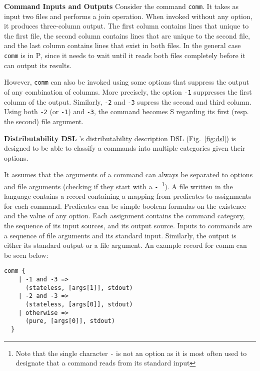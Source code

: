 \documentclass[sigplan,10pt,review,anonymous]{acmart}
\newcommand{\heading}[1]{\vspace{4pt}\noindent\textbf{#1}\enspace}
\newcommand{\ttt}[1]{\texttt{\small #1}}
\newcommand{\cn}[1]{\mbox{\textcircled{\footnotesize #1}}}
\newcommand{\pur}{\cn{\textsc{P}}\xspace}
\newcommand{\sta}{\cn{\textsc{S}}\xspace}
\begin{document}
\heading{Command Inputs and Outputs}
%
Consider the command \ttt{comm}. It takes as input two files and
performs a join operation. When invoked without any option, it
produces three-column output. The first column contains lines that
unique to the first file, the second column contains lines that are
unique to the second file, and the last column contains lines that
exist in both files. In the general case \ttt{comm} is in \pur, since
it needs to wait until it reads both files completely before it can
output its results.

However, \ttt{comm} can also be invoked using some options that
suppress the output of any combination of columns. More precisely, the
option \ttt{-1} suppresses the first column of the output. Similarly,
\ttt{-2} and \ttt{-3} supress the second and third column. Using both
\ttt{-2} (or \ttt{-1}) and \ttt{-3}, the command becomes \sta
regarding its first (resp. the second) file argument.


\heading{Distributability DSL}
%
\sys's distributability description DSL (Fig.~\ref{fig:dsl}) is
designed to be able to classify a commands into multiple categories
given their options.

It assumes that the arguments of a command can always be separated to
options and file arguments (checking if they start with a
\ttt{-}~\footnote{Note that the single character \ttt{-} is not an
  option as it is most often used to designate that a command reads
  from its standard input}). A file written in the language contains a
record containing a mapping from predicates to assignments for each
command. Predicates can be simple boolean formulas on the existence
and the value of any option. Each assignment contains the command
category, the sequence of its input sources, and its output
source. Inputs to commands are a sequence of file arguments and its
standard input. Similarly, the output is either its standard output or
a file argument. An example record for comm can be seen below:

\begin{lstlisting}[float=h, numbers=none]
  comm {
    | -1 and -3 =>
      (stateless, [args[1]], stdout)
    | -2 and -3 =>
      (stateless, [args[0]], stdout)
    | otherwise =>
      (pure, [args[0]], stdout)
  }
\end{lstlisting}
\end{document}
